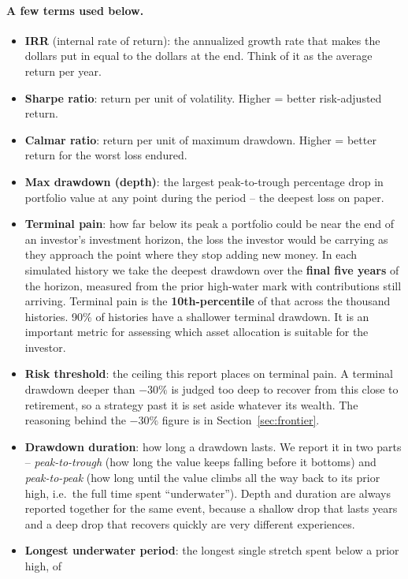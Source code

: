 \documentclass[11pt]{article}
\begin{document}
\paragraph{A few terms used below.}
\begin{itemize}
\item \textbf{IRR} (internal rate of return): the annualized growth rate that makes the dollars
put in equal to the dollars at the end. Think of it as the average return per year.
\item \textbf{Sharpe ratio}: return per unit of volatility. Higher = better risk-adjusted return.
\item \textbf{Calmar ratio}: return per unit of maximum drawdown. Higher = better return for the
worst loss endured.
\item \textbf{Max drawdown (depth)}: the largest peak-to-trough percentage drop in portfolio value
at any point during the period -- the deepest loss on paper.
\item \textbf{Terminal pain}: how far below its peak a portfolio could be near the end of an investor's
investment horizon, the loss the investor would be carrying as they approach the point where they stop
adding new money. In each simulated history we take the deepest drawdown over the \textbf{final five
years} of the horizon, measured from the prior high-water mark with contributions still arriving.
Terminal pain is the \textbf{10th-percentile} of that across the thousand histories. 90\% of histories
have a shallower terminal drawdown. It is an important metric for assessing which asset allocation is
suitable for the investor.
\item \textbf{Risk threshold}: the ceiling this report places on terminal pain. A terminal drawdown
deeper than \textbf{$-30\%$} is judged too deep to recover from this close to retirement, so a strategy
past it is set aside whatever its wealth. The reasoning behind the $-30\%$ figure is in
Section~\ref{sec:frontier}.
\item \textbf{Drawdown duration}: how long a drawdown lasts. We report it in two parts --
\emph{peak-to-trough} (how long the value keeps falling before it bottoms) and \emph{peak-to-peak}
(how long until the value climbs all the way back to its prior high, i.e.\ the full time spent
``underwater''). Depth and duration are always reported together for the same event, because a
shallow drop that lasts years and a deep drop that recovers quickly are very different experiences.
\item \textbf{Longest underwater period}: the longest single stretch spent below a prior high, of

\end{itemize}
\end{document}
